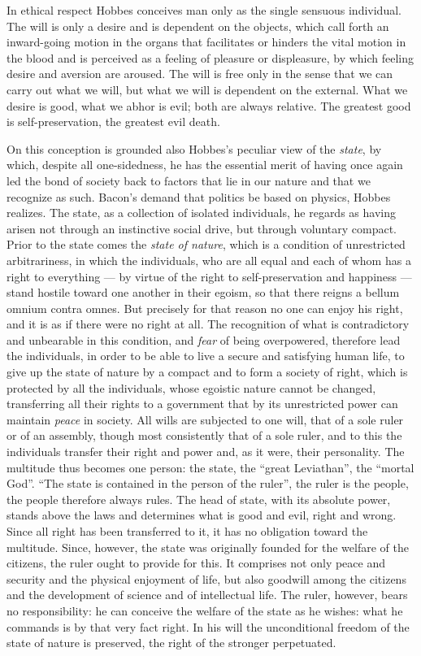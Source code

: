 In ethical respect Hobbes conceives man only as the single sensuous individual. The will is only a desire and is dependent on the objects, which call forth an inward-going motion in the organs that facilitates or hinders the vital motion in the blood and is perceived as a feeling of pleasure or displeasure, by which feeling desire and aversion are aroused. The will is free only in the sense that we can carry out what we will, but what we will is dependent on the external. What we desire is good, what we abhor is evil; both are always relative. The greatest good is self-preservation, the greatest evil death.

On this conception is grounded also Hobbes's peculiar view of the \emph{state}, by which, despite all one-sidedness, he has the essential merit of having once again led the bond of society back to factors that lie in our nature and that we recognize as such. Bacon's demand that politics be based on physics, Hobbes realizes. The state, as a collection of isolated individuals, he regards as having arisen not through an instinctive social drive, but through voluntary compact. Prior to the state comes the \emph{state of nature}, which is a condition of unrestricted arbitrariness, in which the individuals, who are all equal and each of whom has a right to everything --- by virtue of the right to self-preservation and happiness --- stand hostile toward one another in their egoism, so that there reigns a bellum omnium contra omnes. But precisely for that reason no one can enjoy his right, and it is as if there were no right at all. The recognition of what is contradictory and unbearable in this condition, and \emph{fear} of being overpowered, therefore lead the individuals, in order to be able to live a secure and satisfying human life, to give up the state of nature by a compact and to form a society of right, which is protected by all the individuals, whose egoistic nature cannot be changed, transferring all their rights to a government that by its unrestricted power can maintain \emph{peace} in society. All wills are subjected to one will, that of a sole ruler or of an assembly, though most consistently that of a sole ruler, and to this the individuals transfer their right and power and, as it were, their personality. The multitude thus becomes one person: the state, the ``great Leviathan'', the ``mortal God''. ``The state is contained in the person of the ruler'', the ruler is the people, the people therefore always rules. The head of state, with its absolute power, stands above the laws and determines what is good and evil, right and wrong. Since all right has been transferred to it, it has no obligation toward the multitude. Since, however, the state was originally founded for the welfare of the citizens, the ruler ought to provide for this. It comprises not only peace and security and the physical enjoyment of life, but also goodwill among the citizens and the development of science and of intellectual life. The ruler, however, bears no responsibility: he can conceive the welfare of the state as he wishes: what he commands is by that very fact right. In his will the unconditional freedom of the state of nature is preserved, the right of the stronger perpetuated.

